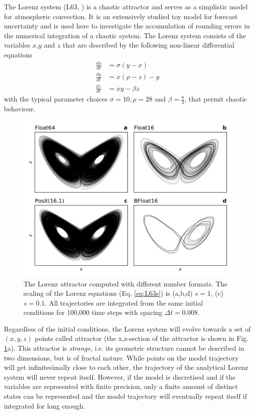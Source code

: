 \documentclass[draft]{agujournal2019}
\begin{document}
The Lorenz system (L63, \cite{Lorenz1963}) is a chaotic attractor and serves as a simplistic model for atmospheric convection. It is an extensively studied toy model for forecast uncertainty \cite{Lorenz1963,Kwasniok2014,Jeffress2017,Tantet2018} and is used here to investigate the accumulation of rounding errors in the numerical integration of a chaotic system. The Lorenz system consists of the variables $x$,$y$ and $z$ that are described by the following non-linear differential equations
\begin{subequations}
\begin{align}
\frac{dx}{dt} &= \sigma(y-x) \\
\frac{dy}{dt} &= x(\rho - z) - y \\
\frac{dz}{dt} &= xy - \beta z
\end{align}
\label{eq:L63}%
\end{subequations}
with the typical parameter choices $\sigma = 10, \rho = 28$ and $\beta = \tfrac{8}{3}$, that permit chaotic behaviour. 

\begin{figure}
\includegraphics[width=1\textwidth]{../plots/lorenz_attractor.png}
\caption{The Lorenz attractor computed with different number formats. The scaling of the Lorenz equations (Eq. \ref{eq:L63s}) is (a,b,d) $s=1$, (c) $s=0.1$. All trajectories are integrated from the same initial conditions for 100,000 time steps with spacing $\Delta t = 0.008$.}
\label{fig:L63}
\end{figure}

Regardless of the initial conditions, the Lorenz system will evolve towards a set of $(x,y,z)$ points called attractor (the x,z-section of the attractor is shown in Fig. \ref{fig:L63}a). This attractor is \emph{strange}, i.e. its geometric structure cannot be described in two dimensions, but is of fractal nature. While points on the model trajectory will get infinitesimally close to each other, the trajectory of the analytical Lorenz system will never repeat itself. However, if the model is discretised and if the variables are represented with finite precision, only a finite amount of distinct states can be represented and the model trajectory will eventually repeat itself if integrated for long enough. 
\end{document}
